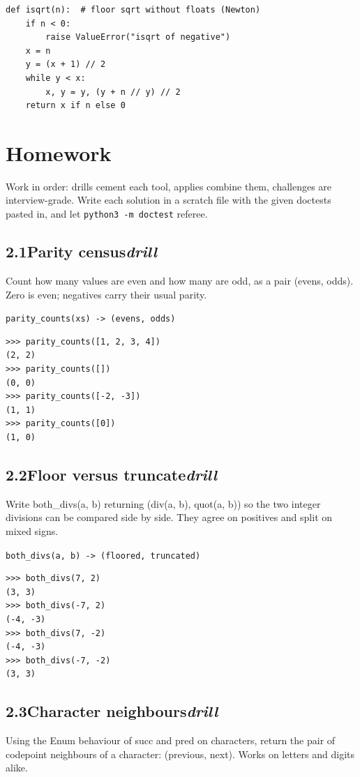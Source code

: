\documentclass[10pt,letterpaper]{book}
\begin{document}
\begin{lstlisting}[style=ex]
def isqrt(n):  # floor sqrt without floats (Newton)
    if n < 0:
        raise ValueError("isqrt of negative")
    x = n
    y = (x + 1) // 2
    while y < x:
        x, y = y, (y + n // y) // 2
    return x if n else 0
\end{lstlisting}
\section{Homework}
Work in order: drills cement each tool, applies combine them,
challenges are interview-grade. Write each solution in a scratch file with
the given doctests pasted in, and let \texttt{python3 -m doctest} referee.
\subsection*{2.1\quad Parity census\hfill\textnormal{\textit{drill}}}
Count how many values are even and how many are odd, as a pair (evens, odds). Zero is even; negatives carry their usual parity.

\noindent\texttt{parity\_counts(xs) -> (evens, odds)}
\begin{lstlisting}[style=ex]
>>> parity_counts([1, 2, 3, 4])
(2, 2)
>>> parity_counts([])
(0, 0)
>>> parity_counts([-2, -3])
(1, 1)
>>> parity_counts([0])
(1, 0)
\end{lstlisting}
\subsection*{2.2\quad Floor versus truncate\hfill\textnormal{\textit{drill}}}
Write both\_divs(a, b) returning (div(a, b), quot(a, b)) so the two integer divisions can be compared side by side. They agree on positives and split on mixed signs.

\noindent\texttt{both\_divs(a, b) -> (floored, truncated)}
\begin{lstlisting}[style=ex]
>>> both_divs(7, 2)
(3, 3)
>>> both_divs(-7, 2)
(-4, -3)
>>> both_divs(7, -2)
(-4, -3)
>>> both_divs(-7, -2)
(3, 3)
\end{lstlisting}
\subsection*{2.3\quad Character neighbours\hfill\textnormal{\textit{drill}}}
Using the Enum behaviour of succ and pred on characters, return the pair of codepoint neighbours of a character: (previous, next). Works on letters and digits alike.
\end{document}
